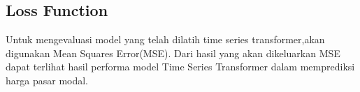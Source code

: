 



\subsection{Loss Function}
Untuk mengevaluasi model yang telah dilatih time series transformer,akan digunakan Mean Squares Error(MSE). Dari hasil yang akan dikeluarkan MSE dapat terlihat hasil performa model Time Series Transformer dalam memprediksi harga pasar modal.
